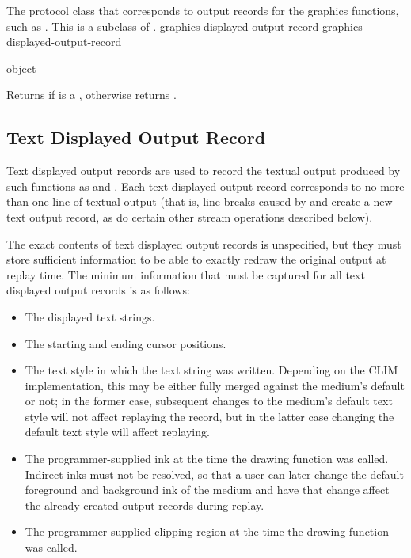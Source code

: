 
The protocol class that corresponds to output records for the graphics
functions, such as .  This is a subclass of
.
 {graphics displayed output record} {graphics-displayed-output-record} 

 {object}

Returns  if  is a , otherwise returns .


\subsection {Text Displayed Output Record}

Text displayed output records are used to record the textual output produced by
such functions as  and .  Each
text displayed output record corresponds to no more than one line of textual
output (that is, line breaks caused by  and  create a
new text output record, as do certain other stream operations described below).

The exact contents of text displayed output records is unspecified, but they
must store sufficient information to be able to exactly redraw the original
output at replay time.  The minimum information that must be captured for all
text displayed output records is as follows:

\begin{itemize}
\item The displayed text strings.

\item The starting and ending cursor positions.

\item The text style in which the text string was written.  Depending on the
CLIM implementation, this may be either fully merged against the medium's
default or not; in the former case, subsequent changes to the medium's default
text style will not affect replaying the record, but in the latter case changing
the default text style will affect replaying.

\item The programmer-supplied ink at the time the drawing function was called.
Indirect inks must not be resolved, so that a user can later change the default
foreground and background ink of the medium and have that change affect the
already-created output records during replay.

\item The programmer-supplied clipping region at the time the drawing function
was called.
\end{itemize}

